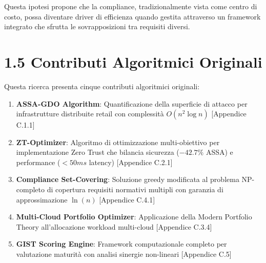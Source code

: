 Questa ipotesi propone che la compliance, tradizionalmente vista come centro di costo, possa diventare driver di efficienza quando gestita attraverso un framework integrato che sfrutta le sovrapposizioni tra requisiti diversi.

\section{1.5 Contributi Algoritmici Originali}

Questa ricerca presenta cinque contributi algoritmici originali:

\begin{enumerate}
\item \textbf{ASSA-GDO Algorithm}: Quantificazione della superficie di attacco 
per infrastrutture distribuite retail con complessità $O(n^2\log n)$ 
[Appendice C.1.1]

\item \textbf{ZT-Optimizer}: Algoritmo di ottimizzazione multi-obiettivo per 
implementazione Zero Trust che bilancia sicurezza ($-42.7\%$ ASSA) e 
performance ($<50ms$ latency) [Appendice C.2.1]

\item \textbf{Compliance Set-Covering}: Soluzione greedy modificata al problema 
NP-completo di copertura requisiti normativi multipli con garanzia di 
approssimazione $\ln(n)$ [Appendice C.4.1]

\item \textbf{Multi-Cloud Portfolio Optimizer}: Applicazione della Modern 
Portfolio Theory all'allocazione workload multi-cloud [Appendice C.3.4]

\item \textbf{GIST Scoring Engine}: Framework computazionale completo per 
valutazione maturità con analisi sinergie non-lineari [Appendice C.5]
\end{enumerate}
